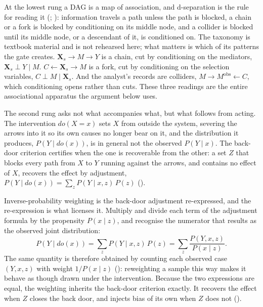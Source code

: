 At the lowest rung a DAG is a map of association, and d-separation is the rule for reading it (; ): information travels a path unless the path is blocked, a chain or a fork is blocked by conditioning on its middle node, and a collider is blocked until its middle node, or a descendant of it, is conditioned on. The taxonomy is textbook material and is not rehearsed here; what matters is which of its patterns the gate creates. $\mathbf{X}_s \to M \to Y$ is a chain, cut by conditioning on the mediators, $\mathbf{X}_s \perp Y \mid M$. $C \leftarrow \mathbf{X}_s \to M$ is a fork, cut by conditioning on the selection variables, $C \perp M \mid \mathbf{X}_s$. And the analyst's records are colliders, $M \to M^{\text{obs}} \leftarrow C$, which conditioning opens rather than cuts. These three readings are the entire associational apparatus the argument below uses.

The second rung asks not what accompanies what, but what follows from acting. The intervention $do(X = x)$ sets $X$ from outside the system, severing the arrows into it so its own causes no longer bear on it, and the distribution it produces, $P(Y \mid do(x))$, is in general not the observed $P(Y \mid x)$. The back-door criterion certifies when the one is recoverable from the other: a set $Z$ that blocks every path from $X$ to $Y$ running against the arrows, and contains no effect of $X$, recovers the effect by adjustment, $P(Y \mid do(x)) = \sum_z P(Y \mid x, z)\, P(z)$ ().

Inverse-probability weighting is the back-door adjustment re-expressed, and the re-expression is what licenses it. Multiply and divide each term of the adjustment formula by the propensity $P(x \mid z)$, and recognise the numerator that results as the observed joint distribution:
\[
P(Y \mid do(x)) = \sum_z P(Y \mid x, z)\, P(z) = \sum_z \frac{P(Y, x, z)}{P(x \mid z)}.
\]
The same quantity is therefore obtained by counting each observed case $(Y, x, z)$ with weight $1 / P(x \mid z)$ (): reweighting a sample this way makes it behave as though drawn under the intervention. Because the two expressions are equal, the weighting inherits the back-door criterion exactly. It recovers the effect when $Z$ closes the back door, and injects bias of its own when $Z$ does not ().

